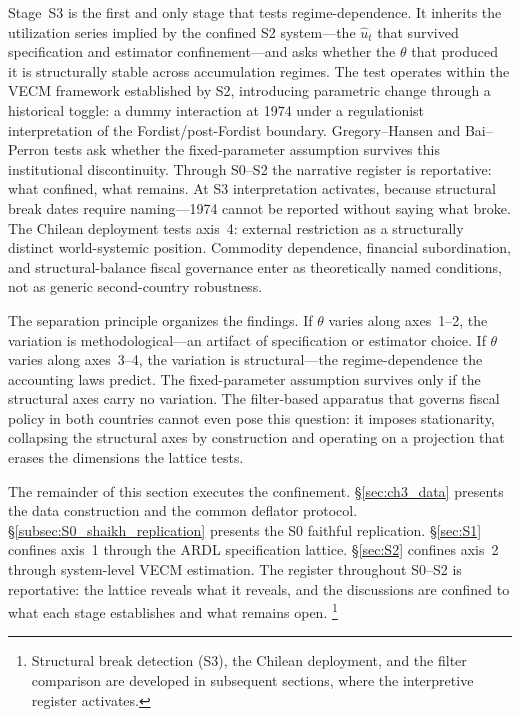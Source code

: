 \documentclass[11pt,a4paper]{article}
\begin{document}
Stage~S3 is the first and only stage that tests regime-dependence. It inherits the utilization series implied by the confined S2 system---the $\hat{u}_t$ that survived specification and estimator confinement---and asks whether the $\theta$ that produced it is structurally stable across accumulation regimes. The test operates within the VECM framework established by S2, introducing parametric change through a historical toggle: a dummy interaction at 1974 under a regulationist interpretation of the Fordist/post-Fordist boundary. Gregory--Hansen and Bai--Perron tests ask whether the fixed-parameter assumption survives this institutional discontinuity. Through S0--S2 the narrative register is reportative: what confined, what remains. At S3 interpretation activates, because structural break dates require naming---1974 cannot be reported without saying what broke. The Chilean deployment tests axis~4: external restriction as a structurally distinct world-systemic position. Commodity dependence, financial subordination, and structural-balance fiscal governance enter as theoretically named conditions, not as generic second-country robustness.

The separation principle organizes the findings. If $\theta$ varies along axes~1--2, the variation is methodological---an artifact of specification or estimator choice. If $\theta$ varies along axes~3--4, the variation is structural---the regime-dependence the accounting laws predict. The fixed-parameter assumption survives only if the structural axes carry no variation. The filter-based apparatus that governs fiscal policy in both countries cannot even pose this question: it imposes stationarity, collapsing the structural axes by construction and operating on a projection that erases the dimensions the lattice tests.

The remainder of this section executes the confinement. \S\ref{sec:ch3_data} presents the data construction and the common deflator protocol. \S\ref{subsec:S0_shaikh_replication} presents the S0 faithful replication. \S\ref{sec:S1} confines axis~1 through the ARDL specification lattice. \S\ref{sec:S2} confines axis~2 through system-level VECM estimation. The register throughout S0--S2 is reportative: the lattice reveals what it reveals, and the discussions are confined to what each stage establishes and what remains open.%
\footnote{Structural break detection (S3), the Chilean deployment, and the filter comparison are developed in subsequent sections, where the interpretive register activates.}
%
\end{document}
